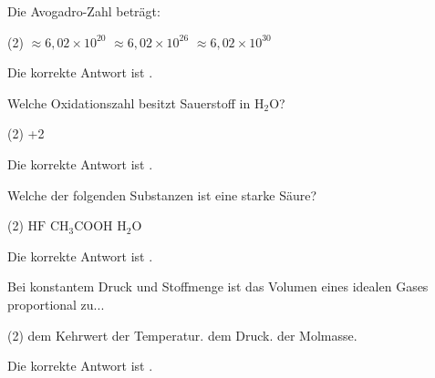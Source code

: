 \begin{exercise}[subtitle=Avogadro-Zahl, points=0.5, Punkt=0.5]
Die Avogadro-Zahl beträgt:
\begin{choices}(2)
  \task \(\approx 6{,}02 \times 10^{20}\)
  \task {}
  \task \(\approx 6{,}02 \times 10^{26}\)
  \task \(\approx 6{,}02 \times 10^{30}\)
\end{choices}
\begin{solution}
Die korrekte Antwort ist \textbf{}.
\end{solution}
\end{exercise}

\begin{exercise}[subtitle=Oxidationszahlen, points=0.5, Punkt=0.5]
Welche Oxidationszahl besitzt Sauerstoff in \(\mathrm{H_2O}\)?
\begin{choices}(2)
  \task +2
  \task {}
\end{choices}
\begin{solution}
Die korrekte Antwort ist \textbf{}.
\end{solution}
\end{exercise}

\begin{exercise}[subtitle=Säure-Base, points=0.5, Punkt=0.5]
Welche der folgenden Substanzen ist eine starke Säure?
\begin{choices}(2)
  \task \(\mathrm{HF}\)
  \task \(\mathrm{CH_3COOH}\)
  \task {}
  \task \(\mathrm{H_2O}\)
\end{choices}
\begin{solution}
Die korrekte Antwort ist \textbf{}.
\end{solution}
\end{exercise}

\begin{exercise}[subtitle=Gasgesetz, points=0.5, Punkt=0.5]
Bei konstantem Druck und Stoffmenge ist das Volumen eines idealen Gases proportional zu...
\begin{choices}(2)
  \task dem Kehrwert der Temperatur.
  \task {}
  \task dem Druck.
  \task der Molmasse.
\end{choices}
\begin{solution}
Die korrekte Antwort ist \textbf{}.
\end{solution}
\end{exercise}

